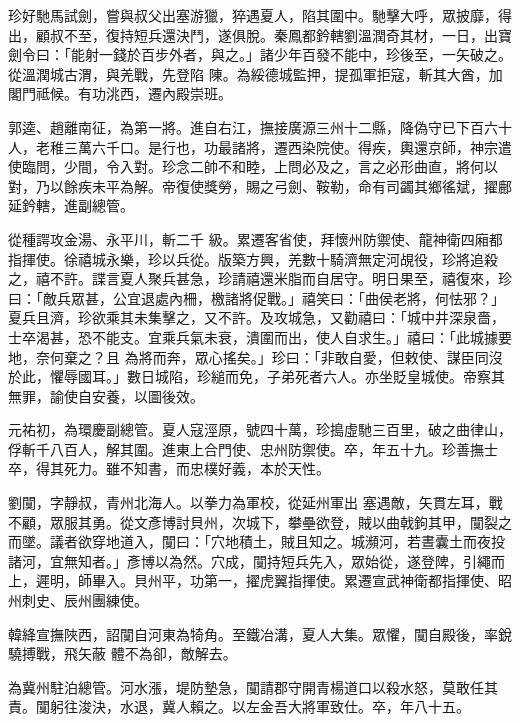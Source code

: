 \begin{pinyinscope}
 珍好馳馬試劍，嘗與叔父出塞游獵，猝遇夏人，陷其圍中。馳擊大呼，眾披靡，得出，顧叔不至，復持短兵還決鬥，遂俱脫。秦鳳都鈐轄劉溫潤奇其材，一日，出寶劍令曰：「能射一錢於百步外者，與之。」諸少年百發不能中，珍後至，一矢破之。從溫潤城古渭，與羌戰，先登陷
 陳。為綏德城監押，提孤軍拒寇，斬其大酋，加閣門祗候。有功洮西，遷內殿崇班。



 郭逵、趙離南征，為第一將。進自右江，撫接廣源三州十二縣，降偽守已下百六十人，老稚三萬六千口。是行也，功最諸將，遷西染院使。得疾，輿還京師，神宗遣使臨問，少間，令入對。珍念二帥不和睦，上問必及之，言之必形曲直，將何以對，乃以餘疾未平為解。帝復使獎勞，賜之弓劍、鞍勒，命有司蠲其鄉徭斌，擢鄜延鈐轄，進副總管。



 從種諤攻金湯、永平川，斬二千
 級。累遷客省使，拜懷州防禦使、龍神衛四廂都指揮使。徐禧城永樂，珍以兵從。版築方興，羌數十騎濟無定河覘役，珍將追殺之，禧不許。諜言夏人聚兵甚急，珍請禧還米脂而自居守。明日果至，禧復來，珍曰：「敵兵眾甚，公宜退處內柵，檄諸將促戰。」禧笑曰：「曲侯老將，何怯邪？」夏兵且濟，珍欲乘其未集擊之，又不許。及攻城急，又勸禧曰：「城中井深泉嗇，士卒渴甚，恐不能支。宜乘兵氣未衰，潰圍而出，使人自求生。」禧曰：「此城據要地，奈何棄之？且
 為將而奔，眾心搖矣。」珍曰：「非敢自愛，但敕使、謀臣同沒於此，懼辱國耳。」數日城陷，珍縋而免，子弟死者六人。亦坐貶皇城使。帝察其無罪，諭使自安養，以圖後效。



 元祐初，為環慶副總管。夏人寇涇原，號四十萬，珍搗虛馳三百里，破之曲律山，俘斬千八百人，解其圍。進東上合門使、忠州防禦使。卒，年五十九。珍善撫士卒，得其死力。雖不知書，而忠樸好義，本於天性。



 劉闃，字靜叔，青州北海人。以拳力為軍校，從延州軍出
 塞遇敵，矢貫左耳，戰不顧，眾服其勇。從文彥博討貝州，次城下，攀壘欲登，賊以曲戟鉤其甲，闃裂之而墜。議者欲穿地道入，闃曰：「穴地積土，賊且知之。城瀕河，若晝囊土而夜投諸河，宜無知者。」彥博以為然。穴成，闃持短兵先入，眾始從，遂登陴，引繩而上，遲明，師畢入。貝州平，功第一，擢虎翼指揮使。累遷宣武神衛都指揮使、昭州刺史、辰州團練使。



 韓絳宣撫陜西，詔闃自河東為犄角。至鐵冶溝，夏人大集。眾懼，闃自殿後，率銳驍搏戰，飛矢蔽
 體不為卻，敵解去。



 為冀州駐泊總管。河水漲，堤防墊急，闃請郡守開青楊道口以殺水怒，莫敢任其責。闃躬往浚決，水退，冀人賴之。以左金吾大將軍致仕。卒，年八十五。




\end{pinyinscope}
